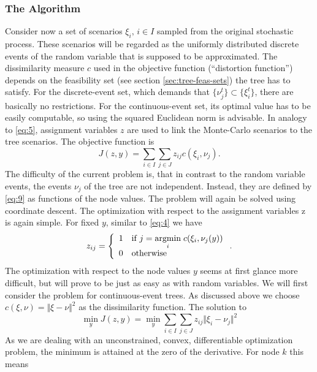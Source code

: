 \subsubsection{The Algorithm}
Consider now a set of scenarios $\xi_i,\, i\in I$ sampled from the original stochastic process.
These scenarios will be regarded as the uniformly distributed discrete events of the random variable that is supposed to be approximated. 
The dissimilarity measure $c$ used in the objective function (``distortion function'') depends on the feasibility set (see section \ref{sec:tree-feas-sets}) the tree has to satisfy.
For the discrete-event set, which demands that $\{\nu_j^t\}\subset\{\xi_i^t\}$, there are basically no restrictions.
For the continuous-event set, its optimal value has to be easily computable, so using the squared Euclidean norm is advisable.
In analogy to \eqref{eq:5}, assignment variables $z$ are used to link the Monte-Carlo scenarios to the tree scenarios.
The objective function is
\begin{equation}
  \label{eq:8}
  J(z, y) = \sum_{i\in I}\sum_{j\in J}z_{ij}c(\xi_i, \nu_j).
\end{equation}
The difficulty of the current problem is, that in contrast to the random variable events, the events $\nu_j$ of the tree are not independent.
Instead, they are defined by \eqref{eq:9} as functions of the node values.
The problem will again be solved using coordinate descent.
The optimization with respect to the assignment variables z is again simple. For fixed $y$, similar to \eqref{eq:4} we have
\begin{equation}
  \label{eq:10}
  z_{ij} = \left\{\begin{array}{ll}1&\text{if }j=\underset{i}{\operatorname{argmin}}\; c(\xi_i,\nu_j(y))\\0&\text{otherwise} \end{array}\right. .  
\end{equation}
The optimization with respect to the node values $y$ seems at first glance more difficult, but will prove to be just as easy as with random variables. We will first consider the problem for continuous-event trees. As discussed above we choose $c(\xi, \nu) = \Vert \xi-\nu\Vert^2$ as the dissimilarity function. The solution to
\begin{equation}
  \label{eq:11}
  \min\limits_y J(z,y) = \min\limits_y \sum_{i\in I}\sum_{j\in J}z_{ij}\Vert \xi_i - \nu_j\Vert^2
\end{equation}
As we are dealing with an unconstrained, convex, differentiable optimization problem, the minimum is attained at the zero of the derivative. For node $k$ this means
